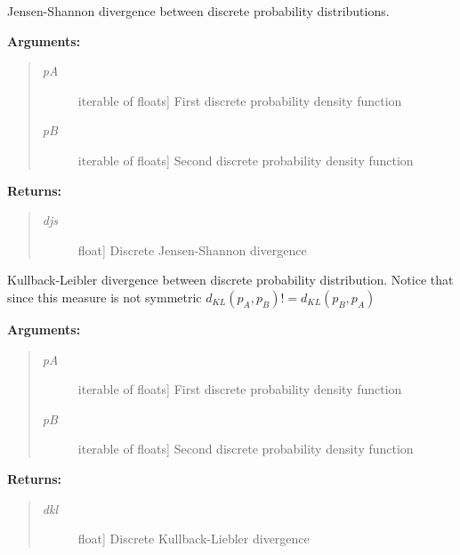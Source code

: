 \documentclass[letterpaper,10pt,english]{sphinxmanual}
\begin{document}
\begin{fulllineitems}
\label{index:encore.similarity.discrete_jensen_shannon_divergence}
Jensen-Shannon divergence between discrete probability distributions.

\textbf{Arguments:}
\begin{quote}
\begin{description}
\item[{\emph{pA}}] \leavevmode{[}iterable of floats{]}
First discrete probability density function

\item[{\emph{pB}}] \leavevmode{[}iterable of floats{]}
Second discrete probability density function

\end{description}
\end{quote}

\textbf{Returns:}
\begin{quote}
\begin{description}
\item[{\emph{djs}}] \leavevmode{[}float{]}
Discrete Jensen-Shannon divergence

\end{description}
\end{quote}

\end{fulllineitems}


\begin{fulllineitems}
\label{index:encore.similarity.discrete_kullback_leibler_divergence}
Kullback-Leibler divergence between discrete probability distribution. Notice that since this measure is not symmetric  \(d_{KL}(p_A,p_B) != d_{KL}(p_B,p_A)\)

\textbf{Arguments:}
\begin{quote}
\begin{description}
\item[{\emph{pA}}] \leavevmode{[}iterable of floats{]}
First discrete probability density function

\item[{\emph{pB}}] \leavevmode{[}iterable of floats{]}
Second discrete probability density function

\end{description}
\end{quote}

\textbf{Returns:}
\begin{quote}
\begin{description}
\item[{\emph{dkl}}] \leavevmode{[}float{]}
Discrete Kullback-Liebler divergence

\end{description}
\end{quote}

\end{fulllineitems}
\end{document}
